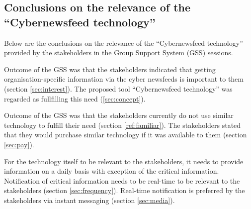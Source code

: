 \subsection{Conclusions on the relevance of the \enquote{Cybernewsfeed technology}}

Below are the conclusions on the relevance of the 
\enquote{Cybernewsfeed technology} provided by the stakeholders 
in the Group Support System (GSS) sessions.

Outcome of the GSS was that the stakeholders indicated 
that getting organisation-specific information via the cyber newsfeeds
is important to them (section \ref{sec:interest}). 
The proposed tool  
\enquote{Cybernewsfeed technology} was regarded as fullfilling
this need (\ref{sec:concept}).

Outcome of the GSS was that the stakeholders currently do not use
similar technology to fulfill their need (section \ref{ref:familiar}).
The stakeholders stated that they would purchase similar technology
if it was available to them (section \ref{sec:pay}).

For the technology itself to be relevant to the stakeholders, 
it needs to provide information on a daily basis
with exception of the critical information.
Notification of critical information needs to be real-time 
to be relevant to the stakeholders (section \ref{sec:frequency}).
Real-time notification is preferred 
by the stakeholders via instant messaging (section \ref{sec:media}). 



    


